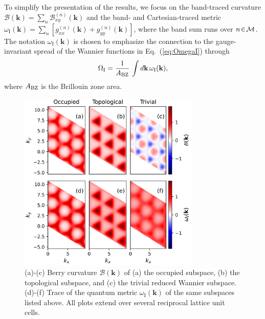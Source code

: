 \documentclass[galley,aps,pra,10pt,amsmath,amssymb,
    superscriptaddress,nofootinbib,longbibliography]{revtex4-2}
\newcounter{comm}
\newcommand{\eq}[1]{Eq.~(\ref{eq:#1})}
\begin{document}
To simplify the presentation of the results, we focus on the band-traced curvature $\mathcal{B}(\textbf{k})=\sum_n \mathcal{B}_{xy}^{(n)}(\textbf{k})$ and the band- and Cartesian-traced metric $\omega_\textrm{I}(\textbf{k})=\sum_n [g_{xx}^{(n)}(\textbf{k})+g_{yy}^{(n)}(\textbf{k})]$, where the band sum runs over $n\!\in\!{\cal M}$. The notation $\omega_\textrm{I}(\textbf{k})$ is chosen to emphasize the connection to the gauge-invariant spread of the Wannier functions in \eq{OmegaI} through \cite{marzari1997}
\begin{equation}
\Omega_\textrm{I}=\frac{1}{A_{\rm BZ}}\,\int d\textbf{k}\, \omega_\textrm{I}(\textbf{k}),
\end{equation}
where $A_{\rm BZ}$ is the Brillouin zone area. 

\begin{figure}[t!]
\begin{center}
\includegraphics[width=3.4in]{fig6.png}
\end{center}
\vspace{-8mm}
\caption{(a)-(c) Berry curvature $\mathcal{B}(\textbf{k})$ of (a) the occupied subspace, (b) the topological subspace, and (c) the trivial reduced Wannier subspace. (d)-(f) Trace of the quantum metric $\omega_\textrm{I}(\textbf{k})$ of the same subspaces listed above. All plots extend over several reciprocal lattice unit cells.}
\label{FIG6}
\end{figure}
\end{document}
